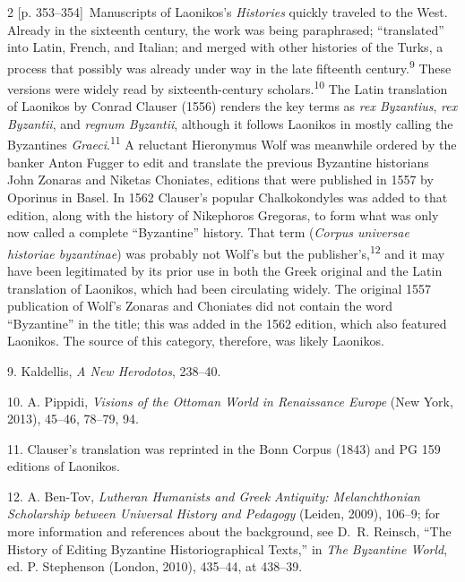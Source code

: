 \documentclass[10pt,a4paper]{article}
\begin{document}
\begin{paracol}{2}
\switchcolumn
{\scriptsize\color{gray}[p. 353–354]}\ Manuscripts of Laonikos’s \textit{Histories} quickly traveled to the West. Already in the sixteenth century, the work was being paraphrased; “translated” into Latin, French, and Italian; and merged with other histories of the Turks, a process that possibly was already under way in the late fifteenth century.\nobreak\textsuperscript{9} These versions were widely read by sixteenth-century scholars.\nobreak\textsuperscript{10} The Latin translation of Laonikos by Conrad Clauser (1556) renders the key terms as \textit{rex Byzantius}, \textit{rex Byzantii}, and \textit{regnum Byzantii}, although it follows Laonikos in mostly calling the Byzantines \textit{Graeci}.\nobreak\textsuperscript{11} A reluctant Hieronymus Wolf was meanwhile ordered by the banker Anton Fugger to edit and translate the previous Byzantine historians John Zonaras and Niketas Choniates, editions that were published in 1557 by Oporinus in Basel. In 1562 Clauser’s popular Chalkokondyles was added to that edition, along with the history of Nikephoros Gregoras, to form what was only now called a complete “Byzantine” history. That term (\textit{Corpus universae historiae byzantinae}) was probably not Wolf’s but the publisher’s,\nobreak\textsuperscript{12} and it may have been legitimated by its prior use in both the Greek original and the Latin translation of Laonikos, which had been circulating widely. The original 1557 publication of Wolf’s Zonaras and Choniates did not contain the word “Byzantine” in the title; this was added in the 1562 edition, which also featured Laonikos. The source of this category, therefore, was likely Laonikos.\par{\small 9.  Kaldellis, \textit{A New Herodotos}, 238–40.\par}{\small 10. A. Pippidi, \textit{Visions of the Ottoman World in Renaissance Europe} (New York, 2013), 45–46, 78–79, 94.\par}{\small 11.  Clauser’s translation was reprinted in the Bonn Corpus (1843) and PG 159\textit{ }editions of Laonikos.\par}{\small 12.  A. Ben-Tov, \textit{Lutheran Humanists and Greek Antiquity: Melanchthonian Scholarship between Universal History and Pedagogy} (Leiden, 2009), 106–9; for more information and references about the background, see D. R. Reinsch, “The History of Editing Byzantine Historiographical Texts,” in \textit{The Byzantine World}, ed. P. Stephenson (London, 2010), 435–44, at 438–39.\par}
\switchcolumn*

\end{paracol}
\end{document}
